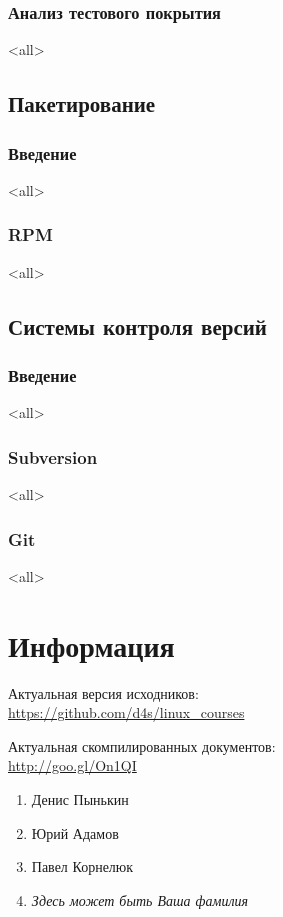 \section{Анализ тестового покрытия}
\mode<all>{}

\chapter{Пакетирование}
\section{Введение}
\mode<all>{}
\section{RPM}
\mode<all>{}

\chapter{Системы контроля версий}
\section{Введение}
\mode<all>{}
\section[SVN]{Subversion}
\mode<all>{}
\section{Git}
\mode<all>{}

\part*{Информация}

Актуальная версия исходников:\\
\url{https://github.com/d4s/linux_courses}

Актуальная скомпилированных документов:\\
\url{http://goo.gl/On1QI}

\bigskip

\begin{enumerate}
		\item Денис Пынькин
		\item Юрий Адамов
		\item Павел Корнелюк
		\item {\it Здесь может быть Ваша фамилия}
\end{enumerate}



